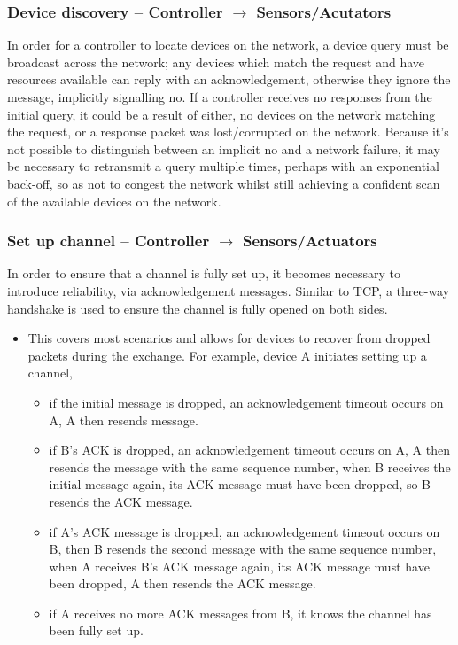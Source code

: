 \subsubsection{Device discovery -- Controller $\rightarrow$ Sensors/Acutators} %
\label{ssub:subsubsection_name}
In order for a controller to locate devices on the network, a device query must be broadcast across the network; any devices which match the request and have resources available can reply with an acknowledgement, otherwise they ignore the message, implicitly signalling no.
If a controller receives no responses from the initial query, it could be a result of either, no devices on the network matching the request, or a response packet was lost/corrupted on the network. Because it's not possible to distinguish between an implicit no and a network failure, it may be necessary to retransmit a query multiple times, perhaps with an exponential back-off, so as not to congest the network whilst still achieving a confident scan of the available devices on the network.


\subsubsection{Set up channel -- Controller $\rightarrow$ Sensors/Actuators} %
\label{ssub:set_up_channel}
In order to ensure that a channel is fully set up, it becomes necessary to introduce reliability, via acknowledgement messages. Similar to TCP, a three-way handshake is used to ensure the channel is fully opened on both sides.
\vspace{-5mm} 
\begin{itemize}
 	\item This covers most scenarios and allows for devices to recover from dropped packets during the exchange. For example, device A initiates setting up a channel,
 	\begin{itemize}
 		\item if the initial message is dropped, an acknowledgement timeout occurs on A, A then resends message.
 		\item if B's ACK is dropped, an acknowledgement timeout occurs on A, A then resends the message with the same sequence number, when B receives the initial message again, its ACK message must have been dropped, so B resends the ACK message.
 		\item if A's ACK message is dropped, an acknowledgement timeout occurs on B, then B resends the second message with the same sequence number, when A receives B's ACK message again, its ACK message must have been dropped, A then resends the ACK message.
 		\item if A receives no more ACK messages from B, it knows the channel has been fully set up.
 	\end{itemize}
 \end{itemize} 

